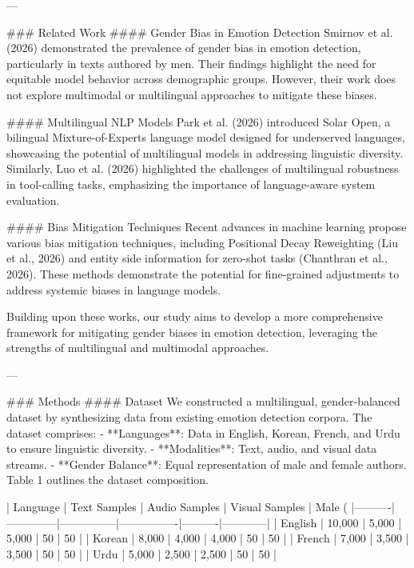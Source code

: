 ---

### Related Work
#### Gender Bias in Emotion Detection
Smirnov et al. (2026) demonstrated the prevalence of gender bias in emotion detection, particularly in texts authored by men. Their findings highlight the need for equitable model behavior across demographic groups. However, their work does not explore multimodal or multilingual approaches to mitigate these biases.

#### Multilingual NLP Models
Park et al. (2026) introduced Solar Open, a bilingual Mixture-of-Experts language model designed for underserved languages, showcasing the potential of multilingual models in addressing linguistic diversity. Similarly, Luo et al. (2026) highlighted the challenges of multilingual robustness in tool-calling tasks, emphasizing the importance of language-aware system evaluation.

#### Bias Mitigation Techniques
Recent advances in machine learning propose various bias mitigation techniques, including Positional Decay Reweighting (Liu et al., 2026) and entity side information for zero-shot tasks (Chanthran et al., 2026). These methods demonstrate the potential for fine-grained adjustments to address systemic biases in language models.

Building upon these works, our study aims to develop a more comprehensive framework for mitigating gender biases in emotion detection, leveraging the strengths of multilingual and multimodal approaches.

---

### Methods
#### Dataset
We constructed a multilingual, gender-balanced dataset by synthesizing data from existing emotion detection corpora. The dataset comprises:
- **Languages**: Data in English, Korean, French, and Urdu to ensure linguistic diversity.
- **Modalities**: Text, audio, and visual data streams.
- **Gender Balance**: Equal representation of male and female authors.
Table 1 outlines the dataset composition.

| Language | Text Samples | Audio Samples | Visual Samples | Male (%
|----------|--------------|---------------|----------------|----------|------------|
| English  | 10,000       | 5,000         | 5,000          | 50       | 50         |
| Korean   | 8,000        | 4,000         | 4,000          | 50       | 50         |
| French   | 7,000        | 3,500         | 3,500          | 50       | 50         |
| Urdu     | 5,000        | 2,500         | 2,500          | 50       | 50         |

